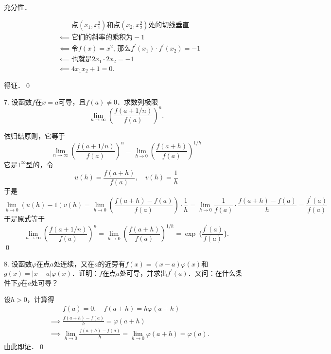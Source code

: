 充分性．

\begin{align}
    &\mathrel{\phantom{\impliedby}} \text{点}(x_1,x_1^2)\text{和点}(x_2,x_2^2)\text{处的切线垂直} \\
    &\impliedby \text{它们的斜率的乘积为} -1 \\
    &\impliedby \text{令}f(x)=x^2, \, \text{那么} f^{\prime}(x_1) \cdot f^{\prime} (x_2) = -1 \\
    &\impliedby \text{也就是} 2x_1 \cdot 2x_2 = -1 \\
    &\impliedby 4x_1 x_2 + 1 = 0.
\end{align}

得证．\qed\bigskip

7. 设函数$f$在$x=a$可导，且$f(a)\neq 0$．求数列极限
\begin{equation}
    \lim_{n \to \infty} \left( \frac{f(a+1/n)}{f(a)} \right)^n .
\end{equation}

\solve 依归结原则，它等于
\begin{equation}
    \lim_{n \to \infty} \left( \frac{f(a+1/n)}{f(a)} \right)^n = \lim_{h \to 0} \left( \frac{f(a+h)}{f(a)}\right)^{1/h}
\end{equation}
它是$1^\infty$型的，令
\begin{equation}
    u(h) = \frac{f(a+h)}{f(a)}, \quad v(h) = \frac{1}{h}
\end{equation}
于是
\begin{equation}
    \lim_{h \to 0} \left(u(h)-1\right)v(h) = \lim_{h \to 0} \left(\frac{f(a+h)-f(a)}{f(a)}\right) \cdot \frac{1}{h} = \lim_{h \to 0} \frac{1}{f(a)} \cdot \frac{f(a+h)-f(a)}{h} = \frac{f^{\prime}(a)}{f(a)}
\end{equation}
于是原式等于
\begin{equation}
    \lim_{n \to \infty} \left( \frac{f(a+1/n)}{f(a)} \right)^n = \lim_{h \to 0} \left( \frac{f(a+h)}{f(a)}\right)^{1/h} = \exp \, \{ \frac{f^{\prime}(a)}{f(a)} \}.
\end{equation}
\qed\bigskip

8. 设函数$\varphi$在点$a$处连续，又在$a$的近旁有$f(x)=(x-a)\varphi (x)$和$g(x)=\lvert x - a \rvert \varphi (x)$．证明：$f$在点$a$处可导，并求出$f^{\prime}(a)$．又问：在什么条件下$g$在$a$处可导？

\prove 设$h > 0$，计算得
\begin{align}
    &\mathrel{\phantom{\implies}} f(a) = 0, \quad f(a+h) = h \varphi (a + h) \\
    &\implies \frac{f(a+h) - f(a)}{h} =  \varphi (a+h) \\
    &\implies \lim_{h \to 0} \frac{f(a+h)-f(a)}{h} = \lim_{h \to 0} \varphi (a+h) = \varphi(a).
\end{align}
由此即证．\qed\bigskip

